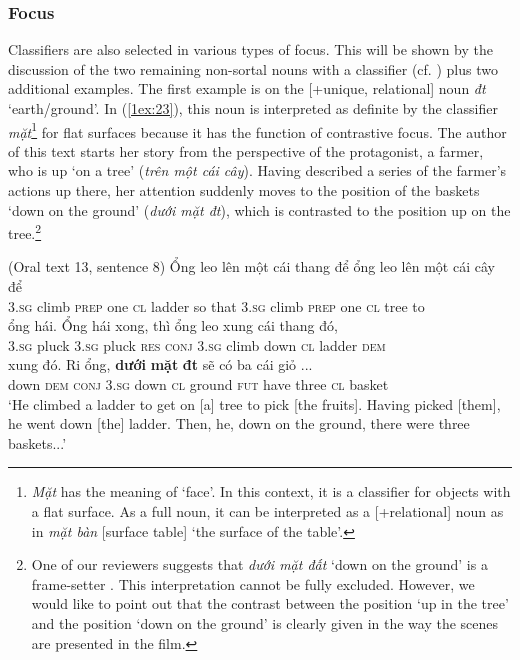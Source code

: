 \documentclass[output=paper]{langsci/langscibook}
\begin{document}
\subsubsection{Focus}\label{1sec:343}
Classifiers are also selected in various types of focus. This will be shown by the discussion of the two remaining non-sortal nouns with a classifier (cf. ) plus two additional examples. The first example is on the [+unique, \minus relational] noun {\emph{đ{\daa}t}} `earth/ground'. In (\ref{1ex:23}), this noun is interpreted as definite by the classifier {\emph{mặt}}\footnote{{\emph{Mặt}} has the meaning of `face'. In this context, it is a classifier for objects with a flat surface. As a full noun, it can be interpreted as a [+relational] noun as in {\emph{mặt bàn}} [surface table] `the surface of the table'.} for flat surfaces because it has the function of contrastive focus. The author of this text starts her story from the perspective of the protagonist, a farmer, who is up `on a tree' ({\emph{trên một cái cây}}). Having described a series of the farmer's actions up there, her attention suddenly moves to the position of the baskets `down on the ground' ({\emph{dưới mặt đ{\daa}t}}), which is contrasted to the position up on the tree.\footnote{One of our reviewers suggests that {\emph{dưới mặt đất}} `down on the ground' is a frame-setter \citep[e.\,g.,][]{krifka:08}. This interpretation cannot be fully excluded. However, we would like to point out that the contrast between the position `up in the tree' and the position `down on the ground' is clearly given in the way the scenes are presented in the film.}

\begin{exe}
\ex\label{1ex:23}
(Oral text 13, sentence 8)
\exi{}
\gll Ổng    leo      lên       một  cái  thang  để         ổng    leo    lên       một  cái cây  để \\
3.{\textsc{sg}}   climb {\textsc{prep}}   one  {\textsc{cl}} ladder  {so that}  3.{\textsc{sg}} climb {\textsc{prep}}  one  {\textsc{cl}} tree  to \\
\glt
\exi{}
\gll ổng    hái.    Ổng    hái    xong,  thì        ổng    leo      xu{\dao}ng  cái    thang   đó, \\
3.{\textsc{sg}} pluck  3.{\textsc{sg}}  pluck {\textsc{res}}   {\textsc{conj}}  3.{\textsc{sg}}  climb  down   {\textsc{cl}}   ladder   {\textsc{dem}}\\
\glt 
\exi{}
\gll xu{\dao}ng  đó.     R{\daob}i      ổng,    {\textbf{dưới}}   {\textbf{mặt}}  {\textbf{đ{\daa}t}}         sẽ     có       ba    cái   giỏ ...\\
down  {\textsc{dem}} {\textsc{conj}}  3.{\textsc{sg}}   down  {\textsc{cl}}   ground  {\textsc{fut}}  have  three {\textsc{cl}}   basket \\
\glt `He climbed a ladder to get on [a] tree to pick [the fruits]. Having picked [them], he went down [the] ladder. Then, he, down on the ground, there were three baskets...'
\end{exe}
\end{document}
